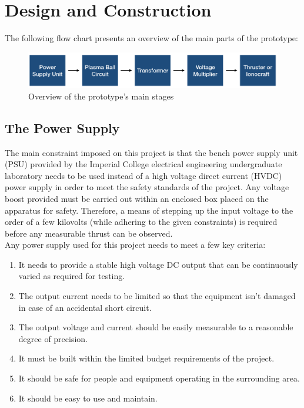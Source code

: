 \documentclass[11pt]{article}
\begin{document}
\pagebreak
\section{Design and Construction}

The following flow chart presents an overview of the main parts of the prototype:

\begin{figure}[h!]
\centering
\includegraphics[width= \textwidth]{flow}
\caption{\label{fig:flow} Overview of the prototype's main stages}
\end{figure}

\subsection{The Power Supply}

The main constraint imposed on this project is that the bench power supply unit (PSU) provided by the Imperial College electrical engineering undergraduate laboratory needs to be used instead of a high voltage direct current (HVDC) power supply in order to meet the safety standards of the project. Any voltage boost provided must be carried out within an enclosed box placed on the apparatus for safety. Therefore, a means of stepping up the input voltage to the order of a few kilovolts (while adhering to the given constraints) is required before any measurable thrust can be observed.\\

Any power supply used for this project needs to meet a few key criteria:

\begin{enumerate}
\item It needs to provide a stable high voltage DC output that can be continuously varied as required for testing.
\item The output current needs to be limited so that the equipment isn't damaged in case of an accidental short circuit.
\item The output voltage and current should be easily measurable to a reasonable degree of precision.
\item It must be built within the limited budget requirements of the project.
\item It should be safe for people and equipment operating in the surrounding area. 
\item It should be easy to use and maintain.\\
\end{enumerate}
\end{document}
